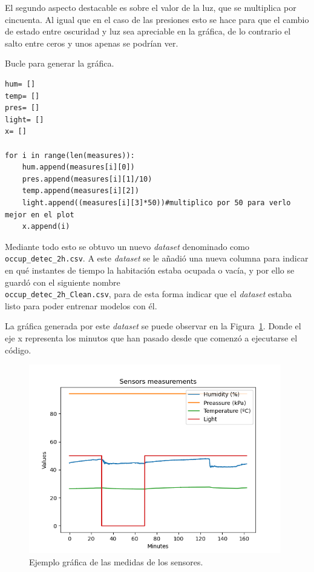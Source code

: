 \documentclass[a4paper, 12pt]{book}
\begin{document}
El segundo aspecto destacable es sobre el valor de la luz, que se multiplica por cincuenta. Al igual que en el caso de las presiones esto se hace para que el cambio de estado entre oscuridad y luz sea apreciable en la gráfica, de lo contrario el salto entre ceros y unos apenas se podrían ver.

\begin{listing}[]
    \caption{Bucle para generar la gráfica.}{}
    \label{lst:secondloop_read_sensor}
    \begin{verbatim}
hum= []
temp= []
pres= []
light= []
x= []

for i in range(len(measures)):
    hum.append(measures[i][0])
    pres.append(measures[i][1]/10)
    temp.append(measures[i][2])
    light.append((measures[i][3]*50))#multiplico por 50 para verlo mejor en el plot
    x.append(i)
    \end{verbatim}
\end{listing}

Mediante todo esto se obtuvo un nuevo \textit{dataset} denominado como \texttt{occup\_detec\_2h.csv}. A este \textit{dataset} se le añadió una nueva columna para indicar en qué instantes de tiempo la habitación estaba ocupada o vacía, y por ello se guardó con el siguiente nombre \\\texttt{occup\_detec\_2h\_Clean.csv}, para de esta forma indicar que el \textit{dataset} estaba listo para poder entrenar modelos con él.

La gráfica generada por este \textit{dataset} se puede observar en la Figura~\ref{fig:ejemplo_gráfica}. Donde el eje x representa los minutos que han pasado desde que comenzó a ejecutarse el código.

\begin{figure}[]
  \centering
  \includegraphics[width=11cm, keepaspectratio]{img/Data_occup_detec_2h_original.png}
  \caption{Ejemplo gráfica de las medidas de los sensores.}\label{fig:ejemplo_gráfica}
\end{figure}
\end{document}
